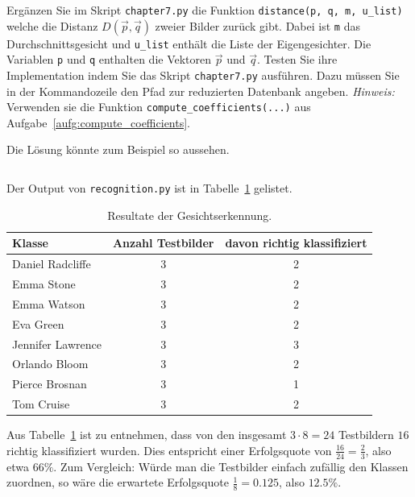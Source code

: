 \begin{aufgabe} \label{aufg:quantification_code}
	Ergänzen Sie im Skript \texttt{chapter7.py} die Funktion \texttt{distance(p, q, m, u\_list)} welche die Distanz $D\left(\vec p,\vec q\right)$ zweier Bilder zurück gibt.
	Dabei ist \texttt{m} das Durchschnittsgesicht und \texttt{u\_list} enthält die Liste der Eigengesichter.
	Die Variablen \texttt{p} und \texttt{q} enthalten die Vektoren $\vec p$ und $\vec q$.
	Testen Sie ihre Implementation indem Sie das Skript \texttt{chapter7.py} ausführen.
	Dazu müssen Sie in der Kommandozeile den Pfad zur reduzierten Datenbank angeben.
	\textit{Hinweis:} Verwenden sie die Funktion \texttt{compute\_coefficients(...)} aus Aufgabe~\ref{aufg:compute_coefficients}.
\end{aufgabe}
\begin{losung}
	Die Lösung könnte zum Beispiel so aussehen.
\inputminted[frame=single,framesep=5pt,firstline=5,lastline=9]{python}{codes/solution/chapter7.py}
	Der Output von \texttt{recognition.py} ist in Tabelle~\ref{tab:recognition} gelistet.
\end{losung}
\begin{table}[ht]
	\centering
	\begin{tabular}{|l|c|c|}
		\hline
		\textbf{Klasse} & \textbf{Anzahl Testbilder} & \textbf{davon richtig klassifiziert} \\ \hline
		Daniel Radcliffe & 3 & 2 \\ \hline
		Emma Stone & 3 & 2 \\ \hline
		Emma Watson & 3 & 2 \\ \hline
		Eva Green & 3 & 2 \\ \hline
		Jennifer Lawrence & 3 & 3 \\ \hline
		Orlando Bloom & 3 & 2 \\ \hline
		Pierce Brosnan & 3 & 1 \\ \hline
		Tom Cruise & 3 & 2 \\ \hline
	\end{tabular}
	\caption{Resultate der Gesichtserkennung.}
	\label{tab:recognition}
\end{table}
Aus Tabelle~\ref{tab:recognition} ist zu entnehmen, dass von den insgesamt $3\cdot8=24$ Testbildern $16$ richtig klassifiziert wurden.
Dies entspricht einer Erfolgsquote von $\frac{16}{24}=\frac{2}{3}$, also etwa $66\%$.
Zum Vergleich: Würde man die Testbilder einfach zufällig den Klassen zuordnen, so wäre die erwartete Erfolgsquote $\frac{1}{8}=0.125$, also $12.5\%$.
